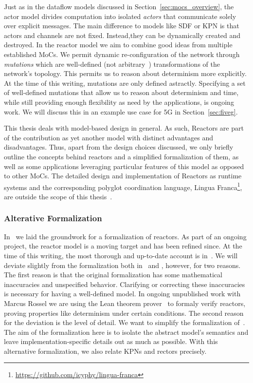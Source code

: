 Just as in the dataflow models discussed in Section~\ref{sec:mocs_overview}, the actor model divides computation into isolated \emph{actors} that communicate solely over explicit messages.
The main difference to models like \ac{SDF} or \ac{KPN} is that actors and channels are not fixed.
Instead,they can be dynamically created and destroyed.
In the reactor model we aim to combine good ideas from multiple established \acp{MoC}.
We permit dynamic re-configuration of the network through \emph{mutations} which are well-defined (not arbitrary~\cite{lohstroh_cyphy19}) transformations of the network's topology.
This permits us to reason about determinism more explicitly. 
At the time of this writing, mutations are only defined astractly.
Specifying a set of well-defined mutations that allow us to reason about determinism and time, while still providing enough flexibility as need by the applications, is ongoing work.
We will discuss this in an example use case for 5G in Section~\ref{sec:fiveg}.

This thesis deals with model-based design in general.
As such, Reactors are part of the contribution as yet another model with distinct advantages and disadvantages.
Thus, apart from the design choices discussed, we only briefly outline the concepts behind reactors and a simplified formalization of them, as well as some applications leveraging particular features of this model as opposed to other \acp{MoC}.
The detailed design and implementation of Reactors as runtime systems and the corresponding polyglot coordination language, Lingua Franca\footnote{\url{https://github.com/icyphy/lingua-franca}}, are outside the scope of this thesis~\cite{lingua_franca,lohstroh_phdthesis}.

\subsubsection{Alterative Formalization}

In~\cite{lohstroh_cyphy19} we laid the groundwork for a formalization of reactors.
As part of an ongoing project, the reactor model is a moving target and has been refined since.
At the time of this writing, the most thorough and up-to-date account is in~\cite{lohstroh_phdthesis}.
We will deviate slightly from the formalization both in~\cite{lohstroh_cyphy19} and \cite{lohstroh_phdthesis}, however, for two reasons.
The first reason is that the original formalization has some mathematical inaccuracies and unspecified behavior.
Clarifying or correcting these inaccuracies is necessary for having a well-defined model.
In ongoing unpublished work with Marcus Rossel we are using the Lean theorem prover~\cite{lean} to formaly verify reactors, proving properties like determinism under certain conditions.
The second reason for the deviation is the level of detail.
We want to simplify the formalization of~\cite{lohstroh_cyphy19,lohstroh_phdthesis}.
The aim of the formalization here is to isolate the abstract model's semantics and leave implementation-specific details out as much as possible.
With this alternative formalization, we also relate \acp{KPN} and rectors precisely.
